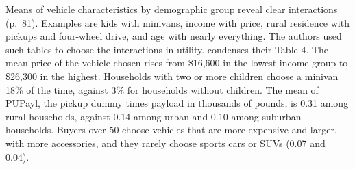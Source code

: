  Means of vehicle characteristics by demographic group reveal clear interactions
(p.~81). Examples are kids with minivans, income with price, rural residence with pickups and four-wheel drive,
and age with nearly everything. The authors used such tables to choose the interactions in utility.
 condenses their Table 4. The mean price of the vehicle chosen rises from \$16,600 in
the lowest income group to \$26,300 in the highest. Households with two or more children choose a minivan 18\% of
the time, against 3\% for households without children. The mean of PUPayl, the pickup dummy times payload in
thousands of pounds, is 0.31 among rural households, against 0.14 among urban and 0.10 among suburban households. Buyers over 50 choose vehicles that are more
expensive and larger, with more accessories, and they rarely choose sports cars or SUVs (0.07 and 0.04).

